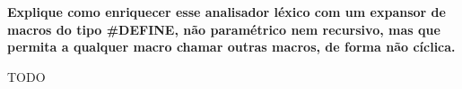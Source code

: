 
\textbf{Explique como enriquecer esse analisador léxico com um expansor de macros do tipo \#DEFINE, não paramétrico nem recursivo, mas que permita a qualquer macro chamar outras macros, de forma não cíclica.}

TODO
